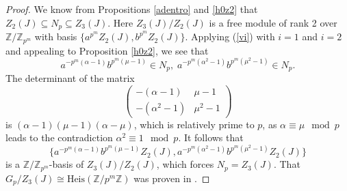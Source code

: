 \documentclass{amsart}
\theoremstyle{definition}
\theoremstyle{remark}
\newcommand \Z{{\mathbb Z}}
\begin{document}
\begin{proof} We know from Propositions \ref{adentro} and \ref{h0z2} that $Z_2(J)\subseteq N_p\subseteq Z_3(J)$.
Here $Z_3(J)/Z_2(J)$ is a free module of rank 2 over $\Z/\Z_{p^m}$ with basis $\{a^{p^m}Z_2(J), b^{p^m}Z_2(J)\}$.
Applying (\ref{vi}) with $i=1$ and $i=2$ and appealing to Proposition \ref{h0z2}, we see that
$$
a^{-p^m(\alpha-1)} b^{p^m(\mu-1)}\in N_p,\; a^{-p^m(\alpha^2-1)} b^{p^m(\mu^2-1)}\in N_p.
$$
The determinant of the matrix
$$
\left(\begin{matrix} -(\alpha-1) & \mu-1 \\ -(\alpha^2-1) & \mu^2-1
\end{matrix}\right)
$$
is $(\alpha-1)(\mu-1)(\alpha-\mu)$, which is relatively prime to $p$, as $\alpha\equiv\mu\mod p$ leads to
the contradiction $\alpha^2\equiv 1\mod p$. It follows that 
$$
\{a^{-p^m(\alpha-1)}b^{p^m(\mu-1)}Z_2(J), a^{-p^m(\alpha^2-1)} b^{p^m(\mu^2-1)} Z_2(J)\}
$$
is a $\Z/\Z_{p^m}$-basis of $Z_3(J)/Z_2(J)$, which forces $N_p=Z_3(J)$. That $G_p/Z_3(J)\cong\mathrm{Heis}(\Z/p^m\Z)$ 
was proven in \cite[Proposition 9.1]{MS}.
\end{proof}


 
\end{document}
